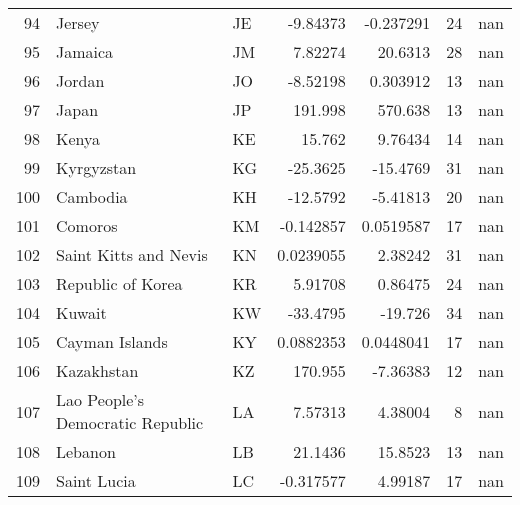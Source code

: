 \begin{tabular}{rllrrrr}
  94 & Jersey                                         & JE         &   -9.84373     &    -0.237291   &     24 &          nan \\
  95 & Jamaica                                        & JM         &    7.82274     &    20.6313     &     28 &          nan \\
  96 & Jordan                                         & JO         &   -8.52198     &     0.303912   &     13 &          nan \\
  97 & Japan                                          & JP         &  191.998       &   570.638      &     13 &          nan \\
  98 & Kenya                                          & KE         &   15.762       &     9.76434    &     14 &          nan \\
  99 & Kyrgyzstan                                     & KG         &  -25.3625      &   -15.4769     &     31 &          nan \\
 100 & Cambodia                                       & KH         &  -12.5792      &    -5.41813    &     20 &          nan \\
 101 & Comoros                                        & KM         &   -0.142857    &     0.0519587  &     17 &          nan \\
 102 & Saint Kitts and Nevis                          & KN         &    0.0239055   &     2.38242    &     31 &          nan \\
 103 & Republic of Korea                              & KR         &    5.91708     &     0.86475    &     24 &          nan \\
 104 & Kuwait                                         & KW         &  -33.4795      &   -19.726      &     34 &          nan \\
 105 & Cayman Islands                                 & KY         &    0.0882353   &     0.0448041  &     17 &          nan \\
 106 & Kazakhstan                                     & KZ         &  170.955       &    -7.36383    &     12 &          nan \\
 107 & Lao People's Democratic Republic               & LA         &    7.57313     &     4.38004    &      8 &          nan \\
 108 & Lebanon                                        & LB         &   21.1436      &    15.8523     &     13 &          nan \\
 109 & Saint Lucia                                    & LC         &   -0.317577    &     4.99187    &     17 &          nan \\

\end{tabular}
